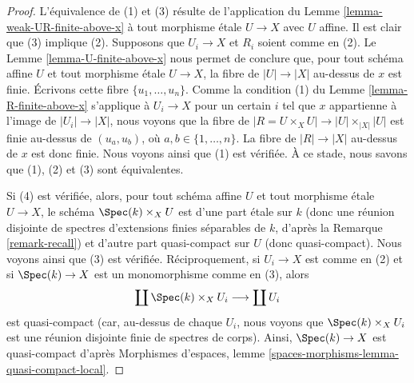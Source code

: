 \begin{proof}
L'équivalence de (1) et (3) résulte de l'application du
Lemme \ref{lemma-weak-UR-finite-above-x}
à tout morphisme étale $U \to X$ avec $U$ affine.
Il est clair que (3) implique (2).
Supposons que $U_i \to X$ et $R_i$ soient comme en (2). Le
Lemme \ref{lemma-U-finite-above-x}
nous permet de conclure que, pour tout schéma affine $U$ et tout morphisme
étale $U \to X$, la fibre de $|U| \to |X|$ au-dessus de $x$ est finie.
Écrivons cette fibre $\{u_1, \ldots, u_n\}$. Comme la condition (1) du
Lemme \ref{lemma-R-finite-above-x}
s'applique à $U_i \to X$ pour un certain $i$ tel que $x$ appartienne à
l'image de $|U_i| \to |X|$, nous voyons que la fibre de
$|R = U \times_X U| \to |U| \times_{|X|} |U|$
est finie au-dessus de $(u_a, u_b)$, où $a, b \in \{1, \ldots, n\}$.
La fibre de $|R| \to |X|$ au-dessus de $x$ est donc finie.
Nous voyons ainsi que (1) est vérifiée. À ce stade, nous savons que
(1), (2) et (3) sont équivalentes.

\medskip\noindent
Si (4) est vérifiée, alors, pour tout schéma affine $U$ et tout morphisme
étale $U \to X$, le schéma $\Spec(k) \times_X U$ est d'une part
étale sur $k$ (donc une réunion disjointe de spectres d'extensions finies
séparables de $k$, d'après la
Remarque \ref{remark-recall})
et d'autre part quasi-compact sur $U$ (donc quasi-compact).
Nous voyons ainsi que (3) est vérifiée.
Réciproquement, si $U_i \to X$ est comme en (2) et si $\Spec(k) \to X$
est un monomorphisme comme en (3), alors
$$
\coprod \Spec(k) \times_X U_i
\longrightarrow
\coprod U_i
$$
est quasi-compact (car, au-dessus de chaque $U_i$, nous voyons que
$\Spec(k) \times_X U_i$ est une réunion disjointe finie de spectres de corps).
Ainsi, $\Spec(k) \to X$ est quasi-compact d'après
Morphismes d'espaces, lemme \ref{spaces-morphisms-lemma-quasi-compact-local}.


\end{proof}
